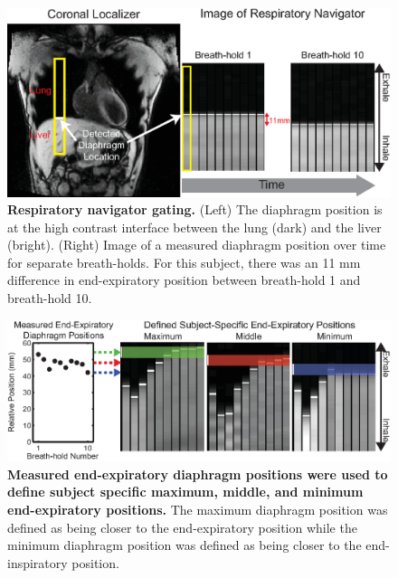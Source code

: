 	\begin{figure}
		\includegraphics{figures/torsionpaper/Fig3-navigatorGatingExplanationNoAccWin}
		\caption[Respiratory navigator gating]{\textbf{Respiratory navigator gating.} (Left) The diaphragm position is at the high contrast interface between the lung (dark) and the liver (bright). (Right) Image of a measured diaphragm position over time for separate breath-holds. For this subject, there was an 11 mm difference in end-expiratory position between breath-hold 1 and breath-hold 10.}
		\label{fig:navigatorgating}
	\end{figure}
	
	\begin{figure}
		\includegraphics{figures/torsionpaper/Fig4-definedTranslatedAccWindow}
		\caption[Measured end expiratory diaphragm positions were used to define subject specific maximum, middle, and minimum end expiratory positions]{\textbf{Measured end-expiratory diaphragm positions were used to define subject specific maximum, middle, and minimum end-expiratory positions.} The maximum diaphragm position was defined as being closer to the end-expiratory position while the minimum diaphragm position was defined as being closer to the end-inspiratory position.}
		\label{fig:navigatorpositions}
	\end{figure}
	
